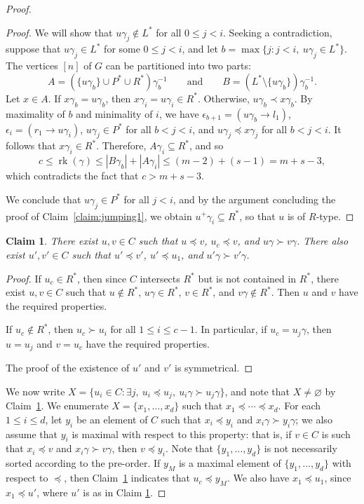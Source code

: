 \documentclass[10pt]{amsart}
\newtheorem{claim}[proposition]{Claim}
\DeclareMathOperator{\rk}{rk}
\newcommand{\set}[2]{\{#1:#2\}}
\newcommand{\nset}{[n]}
\begin{document}
\begin{proof}
\begin{proof}
 We will show that $u\gamma_j \not\in L^*$ for all $0 \leq j < i$. Seeking a
 contradiction, suppose that $u\gamma_j\in L^*$ for some $0\leq j < i$, and
 let $b = \max\{j : j < i,\ u\gamma_j \in L^*\}$. The vertices $\nset$ of $G$ can be partitioned into two parts:
 \[A = (\{u\gamma_b\} \cup
 P^* \cup R^*) \gamma_b^{-1} \qquad\text{and}\qquad B
 = (L^* \setminus \{u\gamma_b\}) \gamma_b^{-1}.\]
 Let $x \in A$. If $x \gamma_b = u \gamma_b$, then $x \gamma_i = u \gamma_i
 \in R^*$. Otherwise, $u \gamma_b \prec x \gamma_b$.
 By maximality of $b$ and minimality of $i$, we have $\epsilon_{b+1}=(u\gamma_b\to l_1)$, $\epsilon_i=(r_1\to u\gamma_i)$, $u\gamma_j\in P^*$ for all $b<j<i$, and $u\gamma_j\preceq x\gamma_j$ for all $b<j<i$. It follows that $x\gamma_i\in R^*$.
%
 Therefore, $A\gamma_i \subseteq R ^*$, and so 
 \[c \le \rk(\gamma) \le |B \gamma_b| + |A \gamma_i| \le (m-2) + (s-1) = m + s
 - 3,\]
 which contradicts the fact that $c > m+s-3$. 

 We conclude that $u\gamma_j \in P^*$ for all $j < i$, and by the argument
 concluding the proof of Claim~\ref{claim:jumping1}, we obtain $u^+\gamma_i
 \subseteq R^*$, so that $u$ is of $R$-type.
\end{proof} 


\begin{claim} \label{claim:jump}
 There exist $u, v \in C$ such that $u\preceq v$, $u_c\preceq v$, and $u\gamma
 \succ v\gamma$. There also exist $u', v' \in C$ such that $u'\preceq v'$,
 $u' \preceq u_1$, and $u'\gamma \succ v'\gamma$. 
\end{claim}

\begin{proof}
 If $u_c \in R^*$, then since $C$ intersects $R^*$ but is not contained in
 $R^*$, there exist $u, v \in C$ such that $u \notin R^*$, $u \gamma \in
 R^*$, $v \in R^*$, and $v \gamma \notin R^*$. Then $u$ and $v$ have the
 required properties.

 If $u_c \notin R^*$, then $u_c \succ u_i$ for all $1 \le i \le c-1$. In
 particular, if $u_c=u_j\gamma$, then $u = u_j$ and $v = u_c$ have the
 required properties.

The proof of the existence of $u'$ and $v'$ is symmetrical.
\end{proof}

We now write $X = \set{u_i \in C}{\exists j,\ u_i\preceq u_j,\ u_i\gamma \succ
u_j\gamma}$, and note that $X\not=\varnothing$ by Claim~\ref{claim:jump}.
%
We enumerate $X = \{x_1, \dots, x_d\}$ such that $x_1 \preceq\cdots\preceq x_d$. For each $1\leq i\leq d$,
let $y_i$ be an element of $C$ such that $x_i\preceq y_i$ and $x_i\gamma
\succ y_i\gamma$; we also assume that $y_i$ is maximal with respect to this property: that is, if $v\in C$ is such that $x_i\preceq v$ and $x_i\gamma \succ v\gamma$,
then $v \preceq y_i$. Note that $\{y_1, \ldots, y_d\}$ is not necessarily
sorted according to the pre-order. If $y_M$ is a maximal element of $\{y_1,
\ldots, y_d\}$ with respect to $\preceq$, then Claim~\ref{claim:jump} indicates
that $u_c \preceq y_M$. We also have $x_1 \preceq u_1$, since $x_1\preceq u'$, where $u'$ is as in Claim \ref{claim:jump}.


\end{proof}
\end{document}
